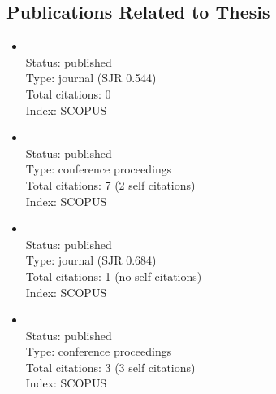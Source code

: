 \begin{refsection}
\section*{Publications Related to Thesis}
    \begin{itemize}
		\item{}\vspace{2mm}\\Status: published\\Type: journal (SJR 0.544)\\Total citations: 0\\Index: SCOPUS
		\item{}\vspace{2mm}\\Status: published\\Type: conference proceedings\\Total citations: 7 (2 self citations)\\Index: SCOPUS
		\item{}\vspace{2mm}\\Status: published\\Type: journal (SJR 0.684)\\Total citations: 1 (no self citations)\\Index: SCOPUS
		\item{}\vspace{2mm}\\Status: published\\Type: conference proceedings\\Total citations: 3 (3 self citations)\\Index: SCOPUS
\end{itemize}

\newpage

\end{refsection}

